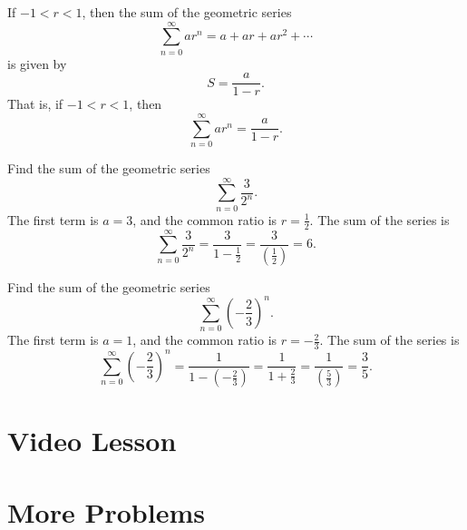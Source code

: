 \documentclass{ximera}
\begin{document}
\begin{theorem}
If $-1 < r < 1$, then the sum of the geometric series 
\[
\sum_{n=0}^\infty ar^n = a + ar + ar^2 + \cdots
\] is given by 
\[
S = \frac{a}{1-r}.
\]
That is, if $-1 < r < 1$, then
\[
\sum_{n=0}^\infty ar^n = \frac{a}{1-r}.
\]
\end{theorem}

\begin{example}
Find the sum of the geometric series 
\[
\sum_{n=0}^\infty \frac{3}{2^n}.
\]
The first term is $a = 3$, and the common ratio is $r = \frac12$. The sum of the series is
\[
\sum_{n=0}^\infty \frac{3}{2^n} = \frac{3}{1-\frac12} = \frac{3}{\left(\frac12\right)} = 6.
\]
\end{example}



\begin{example}
Find the sum of the geometric series 
\[
\sum_{n=0}^\infty \left(-\frac23\right)^n.
\]
The first term is $a = 1$, and the common ratio is $r = -\frac23$. The sum of the series is
\[
\sum_{n=0}^\infty \left(-\frac23\right)^n = \frac{1}{1-\left(-\frac23\right)} = \frac{1}{1 + \frac23} = \frac{1}{\left(\frac53\right)} = \frac35.
\]
\end{example}



\section{Video Lesson}


\begin{center}
\begin{foldable}
\end{foldable}
\end{center}


\section{More Problems}
\end{document}
